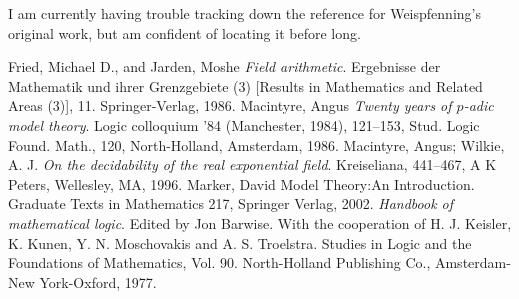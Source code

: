\documentclass{article}
\begin{document}
I am currently having trouble tracking down the reference for
Weispfenning's original work, but am confident of locating it before
long.

\begin{thebibliography}{10}

Fried, Michael D., and Jarden, Moshe 
{\em Field arithmetic}.
\newblock Ergebnisse der Mathematik
   und ihrer Grenzgebiete (3) [Results in Mathematics and Related Areas
(3)], 11.
   Springer-Verlag, 1986.
   Macintyre, Angus 
   {\em Twenty years of $p$-adic model theory}. 
   \newblock Logic
colloquium
   '84 (Manchester, 1984), 121--153, Stud. Logic Found. Math., 120,
North-Holland,
   Amsterdam, 1986.
Macintyre, Angus; Wilkie, A. J. {\em On the decidability of the real
exponential
   field}. 
   \newblock Kreiseliana, 441--467, A K Peters, Wellesley, MA, 1996.
Marker, David Model Theory:An Introduction.
\newblock Graduate Texts in Mathematics
217, Springer Verlag, 2002.
   {\em Handbook of mathematical logic}. Edited by Jon Barwise. With the
   cooperation of H. J. Keisler, K. Kunen, Y. N. Moschovakis and A. S.
Troelstra. 
\newblock Studies in Logic
   and the Foundations of Mathematics, Vol. 90. North-Holland Publishing
Co., Amsterdam-New
   York-Oxford, 1977.

\end{thebibliography}
\end{document}
